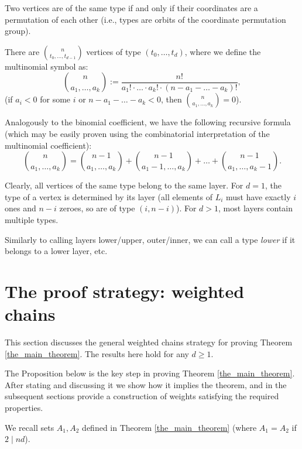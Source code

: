 \documentclass[11pt, reqno]{amsart}
\theoremstyle{remark}
\numberwithin{equation}{section}
\begin{document}
Two vertices are of the same type if and only if their coordinates are a permutation of each other (i.e., types are orbits of the coordinate permutation group).

There are $\binom{n}{t_0, \ldots, t_{d-1}}$ vertices of type $(t_0, \ldots, t_{d})$, where we define the multinomial symbol as:
\begin{equation*}
    \binom{n}{a_1, \ldots, a_k}:=\frac{n!}{a_1! \cdot \ldots \cdot a_k! \cdot (n-a_1-\ldots-a_k)!},
\end{equation*}
(if $a_i < 0$ for some $i$ or $n-a_1-\ldots-a_k<0$, then $\binom{n}{a_1, \ldots, a_k}=0$).

Analogously to the binomial coefficient, we have the following recursive formula (which may be easily proven using the combinatorial interpretation of the multinomial coefficient):
\begin{equation}
\label{multinomial_newton_triangle}
    \binom{n}{a_1, \ldots, a_k} = \binom{n-1}{a_1, \ldots, a_k} + \binom{n-1}{a_1-1, \ldots, a_k} + \ldots + \binom{n-1}{a_1, \ldots, a_k-1}.
\end{equation}

Clearly, all vertices of the same type belong to the same layer. For $d=1$, the type of a vertex is determined by its layer (all elements of $L_i$ must have exactly $i$ ones and $n-i$ zeroes, so are of type $(i, n-i)$). For $d>1$, most layers contain multiple types.

Similarly to calling layers lower/upper, outer/inner, we can call a type \emph{lower} if it belongs to a lower layer, etc.

\section{The proof strategy: weighted chains}
\label{section_assigning_preliminary}

This section discusses the general weighted chains strategy for proving Theorem \ref{the_main_theorem}. The results here hold for any $d \geqslant 1$.

The Proposition below is the key step in proving Theorem \ref{the_main_theorem}. After stating and discussing it we show how it implies the theorem, and in the subsequent sections provide a construction of weights satisfying the required properties.

We recall sets $A_1, A_2$ defined in Theorem \ref{the_main_theorem} (where $A_1=A_2$ if $2 \mid nd$).
\end{document}
